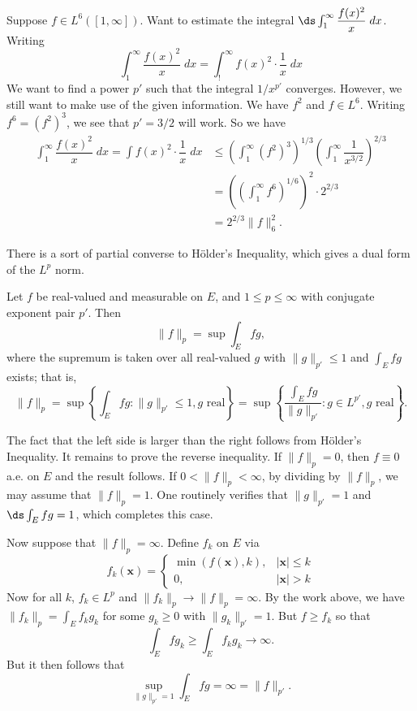 \begin{ex}
Suppose $f \in L^6([1,\infty])$. Want to estimate the integral $\ds \int_1^\infty \dfrac{f(x)^2}{x} \; dx$. Writing 
	\[
	\int_1^\infty \dfrac{f(x)^2}{x} \; dx= \int_!^\infty f(x)^2 \cdot \dfrac{1}{x} \; dx
	\]
We want to find a power $p'$ such that the integral $1/x^{p'}$ converges. However, we still want to make use of the given information. We have $f^2$ and $f \in L^6$. Writing $f^6=(f^2)^3$, we see that $p'= 3/2$ will work. So we have
	\[
	\begin{split}
	\int_1^\infty \dfrac{f(x)^2}{x} \; dx= \int f(x)^2 \cdot \dfrac{1}{x} \; dx  &\leq \left( \int_1^\infty (f^2)^3 \right)^{1/3} \left( \int_1^\infty \dfrac{1}{x^{3/2}} \right)^{2/3} \\
	&= \left( \left( \int_1^\infty f^6 \right)^{1/6} \right)^2 \cdot 2^{2/3} \\
	&= 2^{2/3} \|f\|_6^2.
	\end{split}
	\] \xqed
\end{ex} 


There is a sort of partial converse to H\"older's Inequality, which gives a dual form of the $L^p$ norm.


\begin{thm}
Let $f$ be real-valued and measurable on $E$, and $1 \leq p \leq \infty$ with conjugate exponent pair $p'$. Then
	\[
	\|f\|_p = \sup \int_E fg,
	\]
where the supremum is taken over all real-valued $g$ with $\|g\|_{p'} \leq 1$ and $\int_E fg$ exists; that is, 
	\[
	\|f\|_p = \sup \left\{ \int_E fg \colon \|g\|_{p'} \leq 1, g \text{ real} \right\}= \sup \left\{ \dfrac{\int_E fg}{\|g\|_{p'}} \colon g \in L^{p'}, g \text{ real} \right\}.
	\]
\end{thm}

\pf The fact that the left side is larger than the right follows from H\"older's Inequality. It remains to prove the reverse inequality. If $\|f\|_p=0$, then $f \equiv 0$ a.e. on $E$ and the result follows. If $0<\|f\|_p<\infty$, by dividing by $\|f\|_p$, we may assume that $\|f\|_p=1$. One routinely verifies that $\|g\|_{p'}= 1$ and $\ds \int_E fg= 1$, which completes this case. 

Now suppose that $\|f\|_p= \infty$. Define $f_k$ on $E$ via
	\[
	f_k(\mathbf{x})=
	\begin{cases}
	\min(f(\mathbf{x}),k), & |\mathbf{x}| \leq k \\
	0, & |\mathbf{x}| > k
	\end{cases}
	\]
Now for all $k$, $f_k \in L^p$ and $\|f_k\|_p \to \|f\|_p= \infty$. By the work above, we have $\|f_k\|_p = \int_E f_k g_k$ for some $g_k \geq 0$ with $\|g_k\|_{p'}= 1$. But $f \geq f_k$ so that
	\[
	\int_E fg_k \geq \int_E f_k g_k \to \infty. 
	\]
But it then follows that
	\[
	\sup_{\|g\|_{p'}=1} \int_E fg = \infty = \|f\|_{p'}.
	\]


